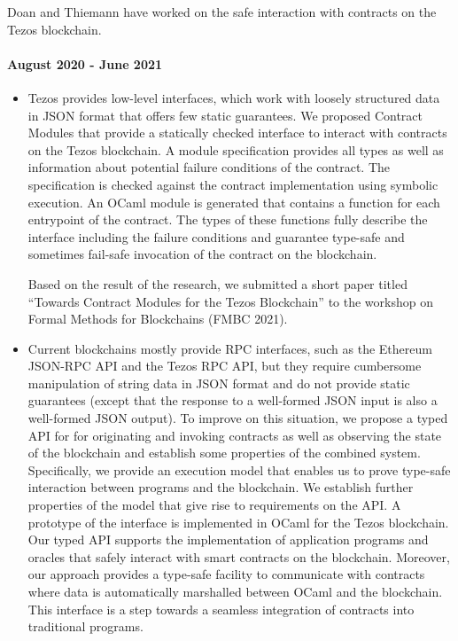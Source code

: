 \documentclass[a4paper,11pt]{article}
\begin{document}
Doan and Thiemann have worked on the safe interaction with contracts on the Tezos blockchain.
\paragraph{August 2020  - June 2021}
\begin{itemize} 
\item Tezos provides low-level interfaces, which work with loosely structured data in JSON format that offers few static guarantees. We proposed Contract Modules that provide a statically checked interface to interact with contracts on the Tezos blockchain. A module specification provides all types as well as information about potential failure conditions of the contract. The specification is checked against the contract implementation using symbolic execution. An OCaml module is generated that contains a function for each entrypoint of the contract. The types of these functions fully describe the interface including the failure conditions and guarantee type-safe and sometimes fail-safe invocation of the contract on the blockchain.

Based on the result of the research, we submitted a short paper titled ``Towards Contract Modules for the Tezos Blockchain''  to the workshop on Formal Methods for Blockchains (FMBC 2021). 

\item Current blockchains mostly provide RPC interfaces, such as the Ethereum JSON-RPC API and the Tezos RPC API, but they require cumbersome manipulation of string data in JSON format and do not provide static
guarantees (except that the response to a well-formed JSON input is also a well-formed JSON output). To improve on this situation, we propose a typed API for for originating and invoking contracts as well as observing the state of the blockchain and establish some properties of the combined system. Specifically, we provide an execution model that enables us to prove type-safe interaction between programs and the blockchain. We establish further properties of the model that give rise to requirements on the API. A prototype of the interface is implemented in OCaml for the Tezos blockchain.  Our typed API supports the
implementation of application programs and oracles that safely interact with
smart contracts on the blockchain. Moreover, our approach provides a type-safe
facility to communicate with contracts where data is automatically marshalled
between OCaml and the blockchain. This interface is a step towards a seamless integration of contracts into traditional programs.


\end{itemize}
\end{document}
